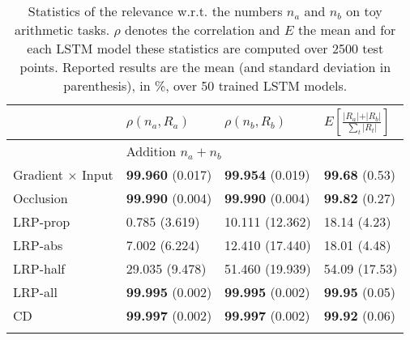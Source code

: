 \documentclass[runningheads]{llncs}
\begin{document}
\begin{table}[t!]
	\centering \footnotesize 
	\caption{Statistics of the relevance w.r.t. the numbers $n_a$ and $n_b$ on toy arithmetic tasks. $\rho$ denotes the correlation and $E$ the mean and for each LSTM model these statistics are computed over 2500 test points. Reported results are the mean (and standard deviation in parenthesis), in \%, over 50 trained LSTM models.}	
	\setlength{\tabcolsep}{6pt}
	\begin{tabular}{ m{2.6cm} m{2.2cm} m{2.2cm} m{2.2cm}}\\
		{}    			                & {$\rho{(n_a, R_a)}$} 	                    & {$\rho{(n_b, R_b)}$}                      & { $ E[\frac{\vert {R_a} \vert + \vert {R_b} \vert}{\sum_{t}{ \vert R_t} \vert } ]$ }      \\[3mm]\midrule
		
		           & \multicolumn{3}{l}{Addition $n_a+n_b$}                                                                                                                                            \\\midrule
		Gradient $\times$ Input 	    & \textbf{99.960} {\tiny(0.017)}			& \textbf{99.954} {\tiny(0.019)}			& \textbf{99.68} {\tiny(0.53)}				                                                \\	
		Occlusion 				        & \textbf{99.990} {\tiny(0.004)}			& \textbf{99.990} {\tiny(0.004)}			& \textbf{99.82} {\tiny(0.27)}		                                                        \\	 
		{LRP-prop}		                & 0.785 {\tiny(3.619)}			            & 10.111 {\tiny(12.362)}				    & 18.14 {\tiny(4.23)}				            	                                        \\	 
		{LRP-abs}		                & 7.002 {\tiny(6.224)}			            & 12.410 {\tiny(17.440)} 				    & 18.01 {\tiny(4.48)}				                                                        \\	 
		{LRP-half}		                & 29.035 {\tiny(9.478)}				        & 51.460 {\tiny(19.939)} 				    & 54.09 {\tiny(17.53)}								                                        \\	 
		{LRP-all}		                & \textbf{99.995} {\tiny(0.002)}			& \textbf{99.995} {\tiny(0.002)}		    & \textbf{99.95} {\tiny(0.05)}			                                                    \\	
		CD				            	& \textbf{99.997} {\tiny(0.002)}			& \textbf{99.997} {\tiny(0.002)}			& \textbf{99.92} {\tiny(0.06)}		                                                        \\ \\[-3mm] \midrule
	

\end{tabular}
\end{table}
\end{document}
